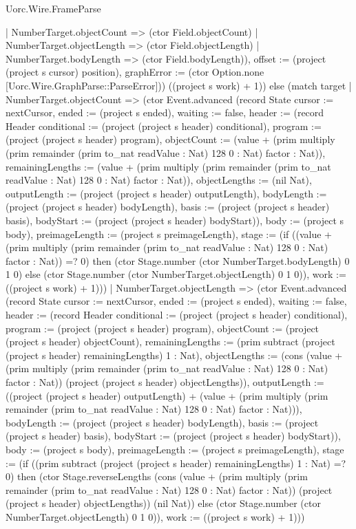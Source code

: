 \begin{lexlean}{Uorc.Wire.FrameParse}
\begin{semanticmodule}
{{        | NumberTarget.objectCount => (ctor Field.objectCount)
        | NumberTarget.objectLength => (ctor Field.objectLength)
        | NumberTarget.bodyLength => (ctor Field.bodyLength)), offset := (project (project s cursor) position), graphError := (ctor Option.none [Uorc.Wire.GraphParse::ParseError])}) ((project s work) + 1)) else (match target
        | NumberTarget.objectCount => (ctor Event.advanced (record State {cursor := nextCursor, ended := (project s ended), waiting := false, header := (record Header {conditional := (project (project s header) conditional), program := (project (project s header) program), objectCount := (value + (prim multiply (prim remainder (prim to_nat readValue : Nat) 128 0 : Nat) factor : Nat)), remainingLengths := (value + (prim multiply (prim remainder (prim to_nat readValue : Nat) 128 0 : Nat) factor : Nat)), objectLengths := (nil Nat), outputLength := (project (project s header) outputLength), bodyLength := (project (project s header) bodyLength), basis := (project (project s header) basis), bodyStart := (project (project s header) bodyStart)}), body := (project s body), preimageLength := (project s preimageLength), stage := (if ((value + (prim multiply (prim remainder (prim to_nat readValue : Nat) 128 0 : Nat) factor : Nat)) =? 0) then (ctor Stage.number (ctor NumberTarget.bodyLength) 0 1 0) else (ctor Stage.number (ctor NumberTarget.objectLength) 0 1 0)), work := ((project s work) + 1)}))
        | NumberTarget.objectLength => (ctor Event.advanced (record State {cursor := nextCursor, ended := (project s ended), waiting := false, header := (record Header {conditional := (project (project s header) conditional), program := (project (project s header) program), objectCount := (project (project s header) objectCount), remainingLengths := (prim subtract (project (project s header) remainingLengths) 1 : Nat), objectLengths := (cons (value + (prim multiply (prim remainder (prim to_nat readValue : Nat) 128 0 : Nat) factor : Nat)) (project (project s header) objectLengths)), outputLength := ((project (project s header) outputLength) + (value + (prim multiply (prim remainder (prim to_nat readValue : Nat) 128 0 : Nat) factor : Nat))), bodyLength := (project (project s header) bodyLength), basis := (project (project s header) basis), bodyStart := (project (project s header) bodyStart)}), body := (project s body), preimageLength := (project s preimageLength), stage := (if ((prim subtract (project (project s header) remainingLengths) 1 : Nat) =? 0) then (ctor Stage.reverseLengths (cons (value + (prim multiply (prim remainder (prim to_nat readValue : Nat) 128 0 : Nat) factor : Nat)) (project (project s header) objectLengths)) (nil Nat)) else (ctor Stage.number (ctor NumberTarget.objectLength) 0 1 0)), work := ((project s work) + 1)}))
}
\end{semanticmodule}
\end{lexlean}
